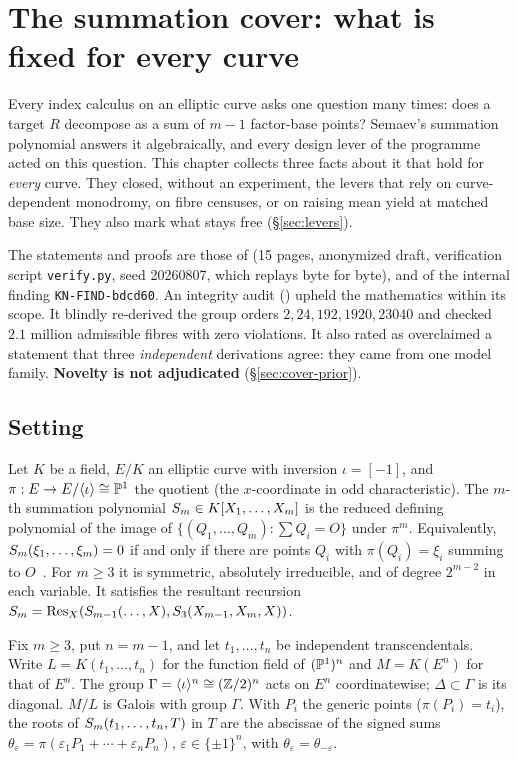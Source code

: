 \chapter{The summation cover: what is fixed for every curve}\label{ch:cover}

Every index calculus on an elliptic curve asks one question many times:
does a target $R$ decompose as a sum of $m-1$ factor-base points? Semaev's
summation polynomial answers it algebraically, and every design lever of
the programme acted on this question. This chapter collects three facts
about it that hold for \emph{every} curve. They closed, without an experiment, the levers
that rely on curve-dependent monodromy, on fibre censuses, or on raising
mean yield at matched base size. They also mark what stays free
(\S\ref{sec:levers}).

The statements and proofs are those of
(15 pages, anonymized draft, verification script
\texttt{verify.py}, seed 20260807, which replays byte for byte), and of the
internal finding \texttt{KN-FIND-bdcd60}. An integrity audit
() upheld
the mathematics within its scope. It blindly re-derived the group orders
$2,24,192,1920,23040$ and checked $2.1$ million admissible fibres with zero
violations. It also rated as overclaimed a statement that three
\emph{independent} derivations agree: they came from one model family.
\textbf{Novelty is not adjudicated} (\S\ref{sec:cover-prior}).

\section{Setting}

Let $K$ be a field, $E/K$ an elliptic curve with inversion $\iota=[-1]$,
and $\pi:E\to E/\langle\iota\rangle\cong\mathbb{P}^1$ the quotient (the
$x$-coordinate in odd characteristic). The $m$-th summation polynomial
$S_{m}\in K[X_1,\dots,X_m]$ is the reduced defining polynomial of the
image of $\{(Q_1,\dots,Q_m):\sum Q_i=O\}$ under $\pi^m$. Equivalently,
$S_{m}(\xi_1,\ldots,\xi_m)=0$ if and only if there are points $Q_i$ with
$\pi(Q_i)=\xi_i$ summing to $O$~\cite{semaev2004}. For $m\ge3$ it is
symmetric, absolutely irreducible, and of degree $2^{m-2}$ in each
variable. It satisfies the resultant recursion
$S_{m}=\operatorname{Res}_X(S_{m-1}(\ldots,X),S_{3}(X_{m-1},X_m,X))$.

Fix $m\ge3$, put $n=m-1$, and let $t_1,\dots,t_n$ be independent
transcendentals. Write $L=K(t_1,\dots,t_n)$ for the function field of
$(\mathbb{P}^1)^n$ and $M=K(E^n)$ for that of $E^n$. The group
$\Gamma=\langle\iota\rangle^n\cong(\mathbb{Z}/2)^n$ acts on $E^n$
coordinatewise; $\Delta\subset\Gamma$ is its diagonal. $M/L$ is Galois with
group $\Gamma$. With $P_i$ the generic points ($\pi(P_i)=t_i$), the roots of
$S_{m}(t_1,\ldots,t_n,T)$ in $T$ are the abscissae of the signed sums
$\theta_\varepsilon=\pi(\varepsilon_1P_1+\cdots+\varepsilon_nP_n)$,
$\varepsilon\in\{\pm1\}^n$, with $\theta_\varepsilon=\theta_{-\varepsilon}$.

